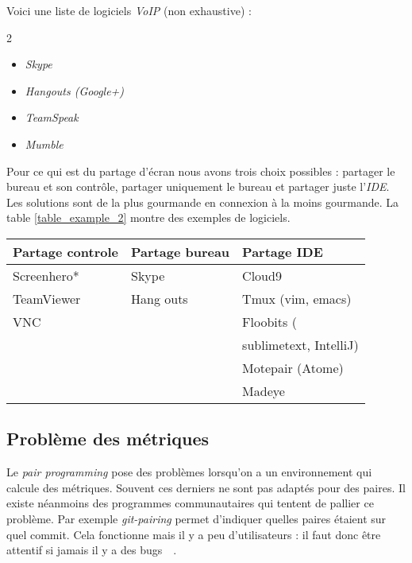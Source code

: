 \documentclass[journal, a4paper, frenchb]{IEEEtran}
\begin{document}
Voici une liste de logiciels \emph{VoIP} (non exhaustive) :

\begin{multicols}{2}
\begin{itemize}
    \item \emph{Skype}
    \item \emph{Hangouts (Google+)}
    \item \emph{TeamSpeak}
    \item \emph{Mumble}
\end{itemize}
\end{multicols}

Pour ce qui est du partage d’écran nous avons trois choix possibles : partager le bureau et son contrôle, partager uniquement le bureau et partager juste l’\emph{IDE}. Les solutions sont de la plus gourmande en connexion à la moins gourmande. La table \ref{table_example_2} montre des exemples de logiciels.

\begin{table*}[!t]
\begin{center}
    \caption{Logiciels facilitant le \emph{pair programming} à distance}
    \label{table_example_2}
    \begin{tabular}{| l | l | l|}
    \hline
    Partage controle & Partage bureau & Partage IDE  \\ \hline
    Screenhero* & Skype & Cloud9 \\
    TeamViewer & Hang outs & Tmux (vim, emacs) \\ 
    VNC &  & Floobits ( \\
     & &  \hspace{1mm}  sublimetext, IntelliJ)\\
     & & Motepair (Atome) \\
     & & Madeye \\
    \hline
    \end{tabular}
\end{center}
\end{table*}

\subsection{Problème des métriques}

Le \emph{pair programming} pose des problèmes lorsqu’on a un environnement qui calcule des métriques. Souvent ces derniers ne sont pas adaptés pour des paires. Il existe néanmoins des programmes communautaires qui tentent de pallier ce problème. Par exemple \emph{git-pairing} permet d’indiquer quelles paires étaient sur quel commit. Cela fonctionne mais il y a peu d’utilisateurs : il faut donc être attentif si jamais il y a des bugs~\cite{PPIde1}~\cite{PPIde2}.
\end{document}
